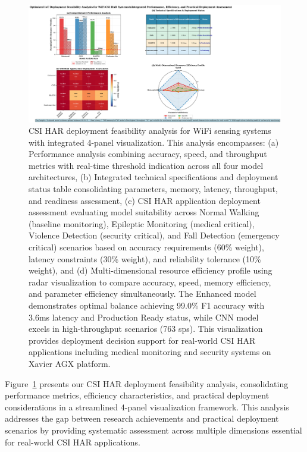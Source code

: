 \documentclass[journal]{IEEEtran}
\begin{document}
\begin{figure}[ht]
\centering
\includegraphics[width=\linewidth]{plots/fig7_comprehensive_deployment_optimized.pdf}
\caption{CSI HAR deployment feasibility analysis for WiFi sensing systems with integrated 4-panel visualization. This analysis encompasses: (a) Performance analysis combining accuracy, speed, and throughput metrics with real-time threshold indication across all four model architectures, (b) Integrated technical specifications and deployment status table consolidating parameters, memory, latency, throughput, and readiness assessment, (c) CSI HAR application deployment assessment evaluating model suitability across Normal Walking (baseline monitoring), Epileptic Monitoring (medical critical), Violence Detection (security critical), and Fall Detection (emergency critical) scenarios based on accuracy requirements (60\% weight), latency constraints (30\% weight), and reliability tolerance (10\% weight), and (d) Multi-dimensional resource efficiency profile using radar visualization to compare accuracy, speed, memory efficiency, and parameter efficiency simultaneously. The Enhanced model demonstrates optimal balance achieving 99.0\% F1 accuracy with 3.6ms latency and Production Ready status, while CNN model excels in high-throughput scenarios (763 sps). This visualization provides deployment decision support for real-world CSI HAR applications including medical monitoring and security systems on Xavier AGX platform.}
\label{fig:comprehensive_deployment}
\end{figure}

Figure~\ref{fig:comprehensive_deployment} presents our CSI HAR deployment feasibility analysis, consolidating performance metrics, efficiency characteristics, and practical deployment considerations in a streamlined 4-panel visualization framework. This analysis addresses the gap between research achievements and practical deployment scenarios by providing systematic assessment across multiple dimensions essential for real-world CSI HAR applications.
\end{document}

